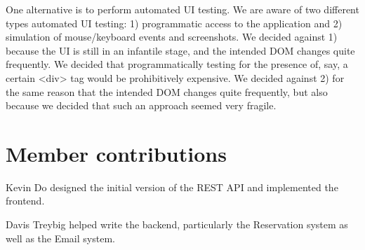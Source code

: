 \documentclass[12pt]{article}
\begin{document}
One alternative is to perform automated UI testing. We are aware of two different types automated UI testing: 1) programmatic access to the application and 2) simulation of mouse/keyboard events and screenshots. We decided against 1) because the UI is still in an infantile stage, and the intended DOM changes quite frequently. We decided that programmatically testing for the presence of, say, a certain <div> tag would be prohibitively expensive. We decided against 2) for the same reason that the intended DOM changes quite frequently, but also because we decided that such an approach seemed very fragile.

\section{Member contributions}
Kevin Do designed the initial version of the REST API and implemented the frontend.

Davis Treybig helped write the backend, particularly the Reservation system as well as the Email system. 

\clearpage
\appendix
\end{document}
